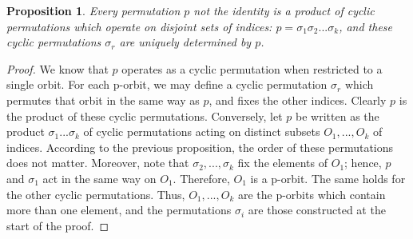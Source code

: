 \documentclass[12pt]{article}
\newtheorem{prop}[thm]{Proposition}
\theoremstyle{definition}
\theoremstyle{remark}
\numberwithin{equation}{section}
\begin{document}
\vspace{15pt}

\begin{prop}
        Every permutation $p$ not the identity is a product of cyclic permutations which operate on disjoint sets of indices: $p = \sigma_1\sigma_2...\sigma_k$, and these cyclic permutations $\sigma_r$ are uniquely determined by $p$.
\end{prop}
\begin{proof}
        We know that $p$ operates as a cyclic permutation when restricted to a single orbit. For each p-orbit, we may define a cyclic permutation $\sigma_r$ which permutes that orbit in the same way as $p$, and fixes the other indices. Clearly $p$ is the product of these cyclic permutations. Conversely, let $p$ be written as the product $\sigma_1...\sigma_k$ of cyclic permutations acting on distinct subsets $O_1,...,O_k$ of indices. According to the previous proposition, the order of these permutations does not matter. Moreover, note that $\sigma_2,...,\sigma_k$ fix the elements of $O_1$; hence, $p$ and $\sigma_1$ act in the same way on $O_1$. Therefore, $O_1$ is a p-orbit. The same holds for the other cyclic permutations. Thus, $O_1,...,O_k$ are the p-orbits which contain more than one element, and the permutations $\sigma_i$ are those constructed at the start of the proof.
\end{proof}


\vspace{15pt}
\end{document}
